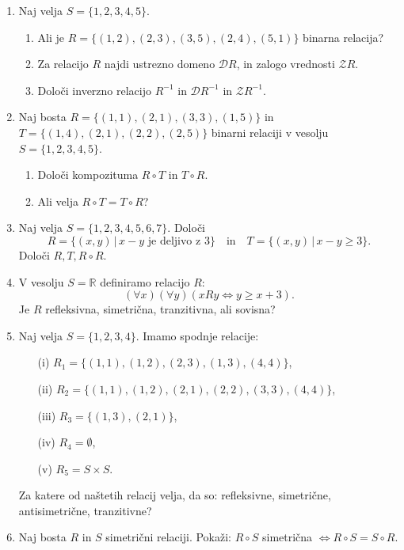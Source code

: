 \documentclass[11pt,paper=b5,footinclude,headinclude]{scrbook} %
\begin{document}
\begin{enumerate}


\item Naj velja $S=\{1,2,3,4,5\}$. 
\begin{enumerate}
    \item Ali je  $R=\{(1,2),(2,3), (3,5), (2,4), (5,1)\}$ binarna relacija?
    \item Za relacijo $R$ najdi ustrezno domeno $\mathcal{D} R$, in zalogo vrednosti $\mathcal{Z} R$.
    \item 
  Določi inverzno relacijo $R^{-1}$ in  $\mathcal{D} R^{-1}$ in  $\mathcal{Z} R^{-1}$.
\end{enumerate}

\item Naj bosta $R=\{(1,1),(2,1), (3,3), (1,5)\}$  in $T=\{(1,4),(2,1), (2,2), (2,5)\}$ binarni relaciji v vesolju $S=\{1,2,3,4,5\}$. \begin{enumerate}
    \item 
Določi kompozituma  $R\circ T$ in $T\circ R$. 
\item Ali velja $R\circ T = T \circ R$?
\end{enumerate}

\item Naj velja  $S=\{1,2,3,4,5,6,7\}$. Določi
$$R= \{(x,y)\,|\, x-y \text{ je deljivo z  }  3\} \quad \mathrm{ in } \quad  T= \{(x,y)\,|\, x-y \geq 3\}.$$
Določi $R,T, R\circ R$.


\item V vesolju  $S= \mathbb{R}$  definiramo  relacijo $R$:
$$(\forall x)(\forall y)(x R y \Leftrightarrow y \geq x +3).$$
Je $R$ refleksivna, simetrična, tranzitivna, ali sovisna?

\item Naj velja  $S=\{1,2,3,4\}$. Imamo spodnje relacije:
\begin{enumerate}
\item[(i)] $R_1= \{(1,1),(1,2),(2,3), (1,3), (4,4)\}$,
\item[(ii)] $R_2= \{(1,1),(1,2),(2,1), (2,2), (3,3), (4,4)\}$,
\item[(iii)] $R_3= \{(1,3),(2,1)\}$,
\item[(iv)] $R_4= \emptyset$,
\item[(v)] $R_5= S\times S$.
\end{enumerate}
Za katere od naštetih relacij velja, da so: refleksivne, simetrične, antisimetrične, tranzitivne? 

\item Naj bosta $R$ in $S$ simetrični relaciji. Pokaži: $R\circ S$ simetrična $\Leftrightarrow R\circ S = S \circ R$.


\end{enumerate}
\end{document}
